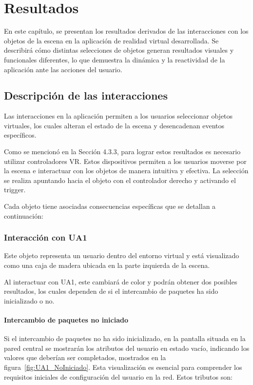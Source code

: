 \documentclass[a4paper, 12pt]{book}
\begin{document}

\cleardoublepage
\chapter{Resultados}
\label{chap:resultados}

En este capítulo, se presentan los resultados derivados de las interacciones con los objetos de la escena en la aplicación 
de realidad virtual desarrollada. Se describirá cómo distintas selecciones de objetos generan resultados visuales y 
funcionales diferentes, lo que demuestra la dinámica y la reactividad de la aplicación ante las acciones del usuario.

\section{Descripción de las interacciones}
\label{sec:descripcion_interacciones}
Las interacciones en la aplicación permiten a los usuarios seleccionar objetos virtuales, 
los cuales alteran el estado de la escena y desencadenan eventos específicos. 

Como se mencionó en la Sección 4.3.3, para lograr estos resultados es necesario utilizar controladores VR. 
Estos dispositivos permiten a los usuarios moverse por la escena e interactuar con los objetos de manera intuitiva y efectiva.
La selección se realiza apuntando hacia el objeto con el controlador derecho y activando el trigger.

Cada objeto tiene asociadas consecuencias específicas que se detallan a continuación:

\subsection{Interacción con UA1}
\label{subsec:objeto_ua1}

Este objeto representa un usuario dentro del entorno virtual y está visualizado como una caja 
de madera ubicada en la parte izquierda de la escena.

Al interactuar con UA1, este cambiará de color y podrán obtener dos posibles resultados, los cuales dependen 
de si el intercambio de paquetes ha sido inicializado o no.

\subsubsection{Intercambio de paquetes no iniciado}
\label{subsubsec:Intercambio_NoIniciado}
Si el intercambio de paquetes no ha sido inicializado, en la pantalla situada en la pared central se mostrarán 
los atributos del usuario en estado vacío, indicando los valores que deberían ser completados, mostrados en la figura~\ref{fig:UA1_NoIniciado}. 
Esta visualización es esencial para comprender los requisitos iniciales de configuración del usuario en la red. Estos tributos son:
\end{document}
